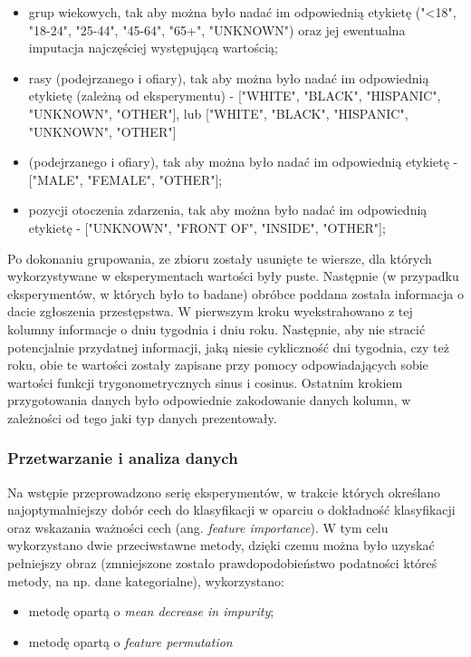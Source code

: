 \documentclass{classrep}
\begin{document}
{{{                \begin{itemize}
                    \item grup wiekowych, tak aby można było nadać im odpowiednią etykietę ("<18", "18-24", "25-44", "45-64", "65+", "UNKNOWN") oraz jej ewentualna imputacja  najczęściej występującą wartością;
                    \item rasy (podejrzanego i ofiary), tak aby można było nadać im odpowiednią etykietę (zależną od eksperymentu) - ["WHITE", "BLACK", "HISPANIC", "UNKNOWN", "OTHER"], lub ["WHITE", "BLACK", "HISPANIC", "UNKNOWN", "OTHER"]
                    \item (podejrzanego i ofiary), tak aby można było nadać im odpowiednią etykietę  - ["MALE", "FEMALE", "OTHER"];
                    \item pozycji otoczenia zdarzenia, tak aby można było nadać im odpowiednią etykietę  - ["UNKNOWN", "FRONT OF", "INSIDE", "OTHER"];
                \end{itemize}
                Po dokonaniu grupowania, ze zbioru zostały usunięte te wiersze, dla których wykorzystywane w eksperymentach wartości były puste. Następnie (w przypadku eksperymentów, w których było to badane) obróbce poddana została informacja o dacie zgłoszenia przestępstwa. W pierwszym kroku wyekstrahowano z tej kolumny informacje o dniu tygodnia i dniu roku. Następnie, aby nie stracić potencjalnie przydatnej informacji, jaką niesie cykliczność dni tygodnia, czy też roku, obie te wartości zostały zapisane przy pomocy odpowiadających sobie wartości funkcji trygonometrycznych sinus i cosinus.
                Ostatnim krokiem przygotowania danych było odpowiednie zakodowanie danych kolumn, w zależności od tego jaki typ danych prezentowały.
            }

            \subsubsection{Przetwarzanie i analiza danych} {
                Na wstępie przeprowadzono serię eksperymentów, w trakcie których określano najoptymalniejszy dobór cech do klasyfikacji w oparciu o dokładność klasyfikacji oraz wskazania ważności cech (ang. \textit{feature importance}). W tym celu wykorzystano dwie przeciwstawne metody, dzięki czemu można było uzyskać pełniejszy obraz (zmniejszone zostało prawdopodobieństwo podatności któreś metody, na np. dane kategorialne), wykorzystano:
                \begin{itemize}
                    \item metodę opartą o \textit{mean decrease in impurity};
                    \item metodę opartą o \textit{feature permutation}
                \end{itemize}
                
}}}
\end{document}
